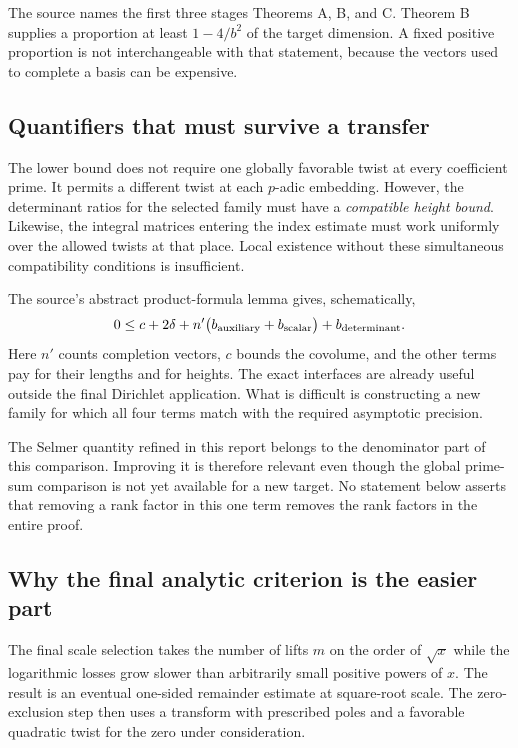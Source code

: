 The source names the first three stages Theorems A, B, and C.
Theorem B supplies a proportion at least \(1-4/b^2\) of the target
dimension. A fixed positive proportion is not interchangeable with
that statement, because the vectors used to complete a basis can be
expensive.\cite{shortenough,longforms}

\subsection{Quantifiers that must survive a transfer}

The lower bound does not require one globally favorable twist at every
coefficient prime. It permits a different twist at each \(p\)-adic
embedding. However, the determinant ratios for the selected family must
have a \emph{compatible height bound}. Likewise, the integral matrices
entering the index estimate must work uniformly over the allowed twists
at that place. Local existence without these simultaneous compatibility
conditions is insufficient.\cite{twistedlattice,heights}

The source's abstract product-formula lemma gives, schematically,
\[
 0\leq c+2\delta+
 n'\bigl(b_{\rm auxiliary}+b_{\rm scalar}\bigr)+b_{\rm determinant}.
\]
Here \(n'\) counts completion vectors, \(c\) bounds the covolume, and the
other terms pay for their lengths and for heights.
The exact interfaces are already useful outside the final Dirichlet
application. What is difficult is constructing a new family for which
all four terms match with the required asymptotic precision.

The Selmer quantity refined in this report belongs to the denominator
part of this comparison. Improving it is therefore relevant even though
the global prime-sum comparison is not yet available for a new target.
No statement below asserts that removing a rank factor in this one
term removes the rank factors in the entire proof.

\subsection{Why the final analytic criterion is the easier part}

The final scale selection takes the number of lifts \(m\) on the order
of \(\sqrt{x}\) while the logarithmic losses grow slower than arbitrarily
small positive powers of \(x\). The result is an eventual one-sided
remainder estimate at square-root scale. The zero-exclusion step then
uses a transform with prescribed poles and a favorable quadratic
twist for the zero under consideration.\cite{onesided,criterion}

